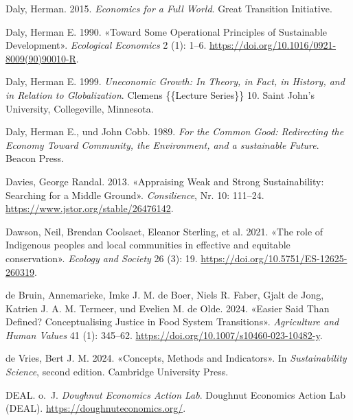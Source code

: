 \documentclass[
  nswissgerman,
  a4paper,
  DIV=11,
  numbers=noendperiod,
  oneside,
  openany]{scrreprt}
\newlength{\cslhangindent}
\newenvironment{CSLReferences}[2] %
 {\begin{list}{}{%
  \setlength{\itemindent}{0pt}
  \setlength{\leftmargin}{0pt}
  \setlength{\parsep}{0pt}
  \ifodd #1
   \setlength{\leftmargin}{\cslhangindent}
   \setlength{\itemindent}{-1\cslhangindent}
  \fi
  \setlength{\itemsep}{#2\baselineskip}}}
 {\end{list}}
\begin{document}
\begin{CSLReferences}{1}{1}
Daly, Herman. 2015. \emph{Economics for a {Full World}}. Great
Transition Initiative.

Daly, Herman E. 1990. {«Toward Some Operational Principles of
Sustainable Development»}. \emph{Ecological Economics} 2 (1): 1--6.
\url{https://doi.org/10.1016/0921-8009(90)90010-R}.

Daly, Herman E. 1999. \emph{Uneconomic {Growth}: {In Theory}, in {Fact},
in {History}, and in {Relation} to {Globalization}}. Clemens \{\{Lecture
Series\}\} 10. Saint John's University, Collegeville, Minnesota.

Daly, Herman E., und John Cobb. 1989. \emph{For the {Common} {Good}:
{Redirecting} the {Economy} {Toward} {Community}, the {Environment}, and
a sustainable {Future}}. Beacon Press.

Davies, George Randal. 2013. {«Appraising {Weak} and {Strong
Sustainability}: {Searching} for a {Middle Ground}»}.
\emph{Consilience}, Nr. 10: 111--24.
\url{https://www.jstor.org/stable/26476142}.

Dawson, Neil, Brendan Coolsaet, Eleanor Sterling, et al. 2021. {«The
role of {Indigenous} peoples and local communities in effective and
equitable conservation»}. \emph{Ecology and Society} 26 (3): 19.
\url{https://doi.org/10.5751/ES-12625-260319}.

{de Bruin, Annemarieke, Imke J. M. de Boer, Niels R. Faber, Gjalt de
Jong, Katrien J. A. M. Termeer, und Evelien M. de Olde}. 2024. {«Easier
Said Than Defined? {Conceptualising} Justice in Food System
Transitions»}. \emph{Agriculture and Human Values} 41 (1): 345--62.
\url{https://doi.org/10.1007/s10460-023-10482-y}.

{de Vries, Bert J. M.} 2024. {«Concepts, {Methods} and {Indicators}»}.
In \emph{Sustainability {Science}}, second edition. Cambridge University
Press.

DEAL. o.~J. \emph{Doughnut {Economics} {Action} {Lab}}. Doughnut
Economics Action Lab (DEAL). \url{https://doughnuteconomics.org/}.


\end{CSLReferences}
\end{document}
